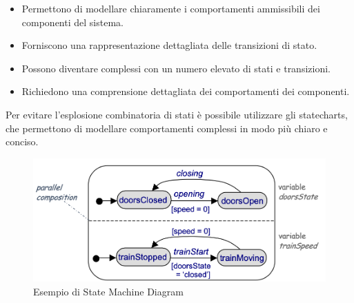 \begin{tcolorbox}[colback=green!5!white,colframe=green!75!black,title=Vantaggi dei
    Diagrammi delle Macchine a Stati]
    \begin{itemize}
        \item Permettono di modellare chiaramente i comportamenti ammissibili dei
        componenti del sistema.
        \item Forniscono una rappresentazione dettagliata delle transizioni di stato.
    \end{itemize}
\end{tcolorbox}

\begin{tcolorbox}[colback=red!5!white,colframe=red!75!black,title=Svantaggi dei
    Diagrammi delle Macchine a Stati]
    \begin{itemize}
        \item Possono diventare complessi con un numero elevato di stati e transizioni.
        \item Richiedono una comprensione dettagliata dei comportamenti dei componenti.
    \end{itemize}
\end{tcolorbox}
Per evitare l'esplosione combinatoria di stati è possibile utilizzare gli statecharts,
che permettono di modellare comportamenti complessi in modo più chiaro e conciso.
\begin{figure}[H]
    \centering
    \includegraphics[scale=0.3]{img/statechart.png}
    \caption{Esempio di State Machine Diagram}
\end{figure}
